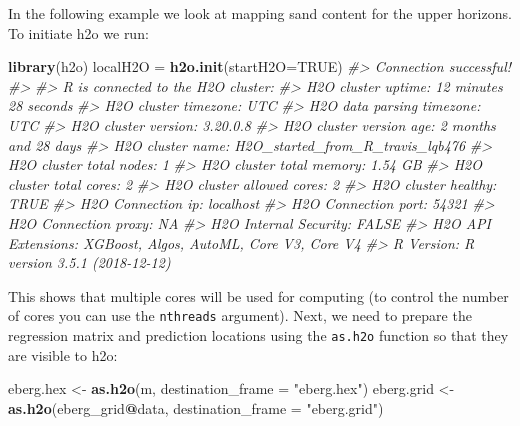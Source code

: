 \documentclass[graybox,natbib,nospthms,UStrade]{svmono}
\newenvironment{Shaded}{\begin{snugshade}}{\end{snugshade}}
\newcommand{\CommentTok}[1]{\textcolor[rgb]{0.37,0.37,0.37}{\textit{#1}}}
\newcommand{\DataTypeTok}[1]{\textcolor[rgb]{0.27,0.27,0.27}{#1}}
\newcommand{\KeywordTok}[1]{\textcolor[rgb]{0.27,0.27,0.27}{\textbf{#1}}}
\newcommand{\NormalTok}[1]{#1}
\newcommand{\OperatorTok}[1]{\textcolor[rgb]{0.43,0.43,0.43}{\textbf{#1}}}
\newcommand{\OtherTok}[1]{\textcolor[rgb]{0.37,0.37,0.37}{#1}}
\newcommand{\StringTok}[1]{\textcolor[rgb]{0.5,0.5,0.5}{#1}}
\begin{document}
In the following example we look at mapping sand content for the upper horizons. To initiate h2o we run:

\begin{Shaded}
\begin{Highlighting}[]
\KeywordTok{library}\NormalTok{(h2o)}
\NormalTok{localH2O =}\StringTok{ }\KeywordTok{h2o.init}\NormalTok{(}\DataTypeTok{startH2O=}\OtherTok{TRUE}\NormalTok{)}
\CommentTok{#>  Connection successful!}
\CommentTok{#> }
\CommentTok{#> R is connected to the H2O cluster: }
\CommentTok{#>     H2O cluster uptime:         12 minutes 28 seconds }
\CommentTok{#>     H2O cluster timezone:       UTC }
\CommentTok{#>     H2O data parsing timezone:  UTC }
\CommentTok{#>     H2O cluster version:        3.20.0.8 }
\CommentTok{#>     H2O cluster version age:    2 months and 28 days  }
\CommentTok{#>     H2O cluster name:           H2O_started_from_R_travis_lqb476 }
\CommentTok{#>     H2O cluster total nodes:    1 }
\CommentTok{#>     H2O cluster total memory:   1.54 GB }
\CommentTok{#>     H2O cluster total cores:    2 }
\CommentTok{#>     H2O cluster allowed cores:  2 }
\CommentTok{#>     H2O cluster healthy:        TRUE }
\CommentTok{#>     H2O Connection ip:          localhost }
\CommentTok{#>     H2O Connection port:        54321 }
\CommentTok{#>     H2O Connection proxy:       NA }
\CommentTok{#>     H2O Internal Security:      FALSE }
\CommentTok{#>     H2O API Extensions:         XGBoost, Algos, AutoML, Core V3, Core V4 }
\CommentTok{#>     R Version:                  R version 3.5.1 (2018-12-12)}
\end{Highlighting}
\end{Shaded}

This shows that multiple cores will be used for computing (to control the number of cores you can use the \texttt{nthreads} argument). Next, we need to prepare the regression matrix and prediction locations using the \texttt{as.h2o} function so that they are visible to h2o:

\begin{Shaded}
\begin{Highlighting}[]
\NormalTok{eberg.hex <-}\StringTok{ }\KeywordTok{as.h2o}\NormalTok{(m, }\DataTypeTok{destination_frame =} \StringTok{"eberg.hex"}\NormalTok{)}
\NormalTok{eberg.grid <-}\StringTok{ }\KeywordTok{as.h2o}\NormalTok{(eberg_grid}\OperatorTok{@}\NormalTok{data, }\DataTypeTok{destination_frame =} \StringTok{"eberg.grid"}\NormalTok{)}
\end{Highlighting}
\end{Shaded}
\end{document}
